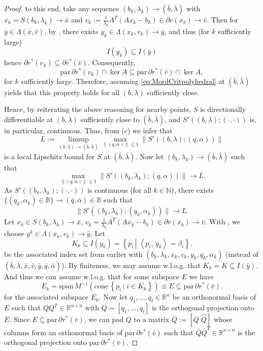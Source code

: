 \documentclass[reqno]{amsart}
\numberwithin{equation}{section}
\newcommand{\R}{\mathbb{R}}
\newcommand{\set}[2]{\left\{#1\,\left\vert\; #2\right.\right\}}
\newcommand{\ip}[2]{\left\langle #1,\, #2\right\rangle}
\newcommand{\para}{\mathrm{par}\,}
\newcommand{\lin}{\mathrm{span}\,}
\newcommand{\cone}{\mathrm{cone}\,}
\begin{document}
\begin{proof}
    to this end, take any sequence $(b_k,\lambda_k)\to (\bar b, \bar \lambda)$ with $x_k=S(b_k,\lambda_k)\to\bar x$ and $v_k:=\frac{1}{\lambda_k}A^T (Ax_k-b_k)\in \partial r(x_k)\to \bar v.$ Then for $\bar y\in \Lambda(\bar x,\bar v)$, by , there exists $y_k\in \Lambda(x_k,v_k)\to \bar y$, and thus (for $k$ sufficiently large)
\[
I(y_k)\subseteq I(\bar y) 
\]
hence $\partial r^*(v_k)\subseteq\partial r^*(\bar v)$.
Consequently, 
\[
\para \partial r^*(v_k)\cap \ker A \subseteq\para \partial r^*(\bar v)\cap \ker A,
\]
for $k$ sufficiently large.  Therefore, assuming \eqref{eq:MordCritpolyhedral} at $(\bar b,\bar \lambda)$ yields that this property holds for all $(b,\lambda)$ sufficiently close.

 Hence, by reiterating the above reasoning for nearby points, $S$ is directionally differentiable at $(b,\lambda)$ sufficiently close to $(\bar b,\bar \lambda)$, and $S'((b,\lambda);(\cdot,\cdot))$ is, in particular, continuous.  Thus,   from (c) we infer that 
\[
L:=\limsup_{(b,\lambda)\to (\bar b,\bar \lambda)} \max_{\|(q,\alpha)\|\leq 1}\|S'((b,\lambda);(q,\alpha))\|
\]
is a local Lipschitz bound for $S$ at $(\bar b,\bar \lambda)$. Now let $(b_k,\lambda_k)\to (\bar b,\bar \lambda)$ such that
\[
 \max_{\|(q,\alpha)\|\leq 1}\|S'((b_k,\lambda_k);(q,\alpha))\|\to L.    
\]
As $S'((b_k,\lambda_k);(\cdot,\cdot))$ is continuous (for all $k\in \mathbb{N}$), there exists  $\{(q_k,\alpha_k)\in \mathbb{B}\}\to (\bar q,\bar \alpha)\in \mathbb{B}$ such that 
\[
\|S'((b_k,\lambda_k);(q_k,\alpha_k))\|\to L.
\]
 Let $x_k\in S(b_k,\lambda_k)\to \bar x$, $v_k=\frac{1}{\lambda_k}A^T(Ax_k-b_k)\in \partial r(x_k)\to \bar v$. With , we choose 
  $y^k\in \Lambda(x_k,v_k)\to \bar y$. Let 
 \[
 K_k\subseteq I(y_k)=\set{p_i}{\ip{p_i}{y_k}=\beta_i}.
 \]
 be the associated index set from earlier with $(b_k,\lambda_k, x_k,v_k, y_k, q_k, \alpha_k)$ (instead of $(\bar b,\bar \lambda, \bar x,\bar v,\bar y, \bar q, \bar \alpha)$).
 By finiteness, we may assume w.l.o.g. that $K_k= K\subseteq I(\bar y)$. And thus we can assume w.l.o.g. that for some subspace $E$ we have 
 \[
 E_k=\lin M^{-1}(\cone\set{p_i}{i\in K_k})\equiv E\subseteq\para\partial r^*(\bar v).
 \]
 for the associated subspace $E_k$.  Now let $q_1,\dots, q_t\in \R^n$ be an orthonormal basis of $E$ such that $QQ^T\in\R^{n\times n}$ with $Q=[q_1,\dots, q_t]$ is the orthogonal projection onto $E$. Since $E\subseteq\para \partial r^*(\bar v)$, we can pad $Q$ to a matrix $\bar Q:=[Q\; \hat Q]$ whose columns form an orthonormal basis of $\para \partial r^*(\bar v)$ such that $\bar Q \bar Q^T\in \R^{n\times n}$ is the orthogonal projection onto $\para \partial r^*(\bar v)$.
 

\end{proof}
\end{document}

